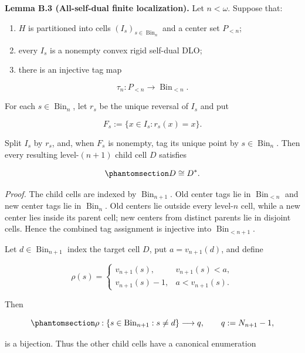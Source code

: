 \documentclass[
  english,
  11pt,
  reqno]{amsart}
\newcounter{none} %
\providecommand{\tightlist}{%
  \setlength{\itemsep}{0pt}\setlength{\parskip}{0pt}}
\begin{document}
\textbf{Lemma B.3 (All-self-dual finite localization).} Let
\(n<\omega\). Suppose that:

\begin{enumerate}
\tightlist
\item
  \(H\) is partitioned into cells \((I_s)_{s\in\operatorname{Bin}_n}\)
  and a center set \(P_{<n}\);
\item
  every \(I_s\) is a nonempty convex rigid self-dual DLO;
\item
  there is an injective tag map
\end{enumerate}

\[
   \tau_n:P_{<n}\longrightarrow\operatorname{Bin}_{<n}.
\]

For each \(s\in\operatorname{Bin}_n\), let \(r_s\) be the unique
reversal of \(I_s\) and put

\[
F_s:=\{x\in I_s:r_s(x)=x\}.
\]

Split \(I_s\) by \(r_s\), and, when \(F_s\) is nonempty, tag its unique
point by \(s\in\operatorname{Bin}_n\). Then every resulting
level-\((n+1)\) child cell \(D\) satisfies

\begin{equation}\protect\phantomsection\label{eq:typefree-child-selfdual}{
D\cong D^*.
}\end{equation}

\emph{Proof.} The child cells are indexed by
\(\operatorname{Bin}_{n+1}\). Old center tags lie in
\(\operatorname{Bin}_{<n}\) and new center tags lie in
\(\operatorname{Bin}_n\). Old centers lie outside every level-\(n\)
cell, while a new center lies inside its parent cell; new centers from
distinct parents lie in disjoint cells. Hence the combined tag
assignment is injective into \(\operatorname{Bin}_{<n+1}\).

Let \(d\in\operatorname{Bin}_{n+1}\) index the target cell \(D\), put
\(a=v_{n+1}(d)\), and define

\[
\rho(s)
=
\begin{cases}
 v_{n+1}(s),&v_{n+1}(s)<a,\\
 v_{n+1}(s)-1,&a<v_{n+1}(s).
\end{cases}
\]

Then

\begin{equation}\protect\phantomsection\label{eq:typefree-remaining-cell-ranking}{
\rho:
\{s\in\operatorname{Bin}_{n+1}:s\ne d\}
\longrightarrow
q,
\qquad
q:=N_{n+1}-1,
}\end{equation}

is a bijection. Thus the other child cells have a canonical enumeration
\end{document}
